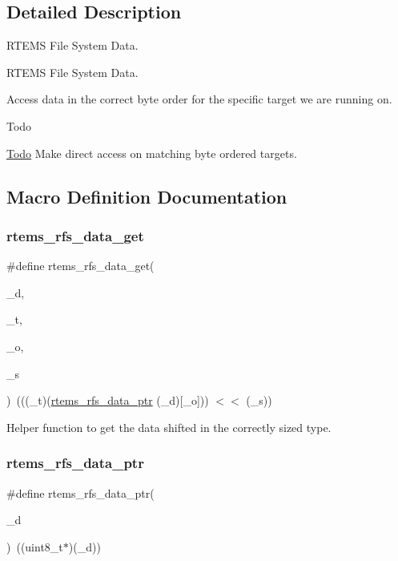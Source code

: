 \subsection{Detailed Description}
R\+T\+E\+MS File System Data. 

R\+T\+E\+MS File System Data.

Access data in the correct byte order for the specific target we are running on.

\begin{DoxyRefDesc}{Todo}
\item[\mbox{\hyperlink{todo__todo000002}{Todo}}]Make direct access on matching byte ordered targets. \end{DoxyRefDesc}


\subsection{Macro Definition Documentation}
\mbox{\label{rtems-rfs-data_8h_a0640dfd9b9ad52e3f44e7c7d387f5f4e}} 
\subsubsection{\texorpdfstring{rtems\_rfs\_data\_get}{rtems\_rfs\_data\_get}}
{\footnotesize\ttfamily \#define rtems\+\_\+rfs\+\_\+data\+\_\+get(\begin{DoxyParamCaption}\item[{}]{\+\_\+d,  }\item[{}]{\+\_\+t,  }\item[{}]{\+\_\+o,  }\item[{}]{\+\_\+s }\end{DoxyParamCaption})~(((\+\_\+t)(\mbox{\hyperlink{rtems-rfs-data_8h_a5fbf9f5b7233acca6b58f1208cd16aff}{rtems\+\_\+rfs\+\_\+data\+\_\+ptr}} (\+\_\+d)\mbox{[}\+\_\+o\mbox{]})) $<$$<$ (\+\_\+s))}

Helper function to get the data shifted in the correctly sized type. \mbox{\label{rtems-rfs-data_8h_a5fbf9f5b7233acca6b58f1208cd16aff}} 
\subsubsection{\texorpdfstring{rtems\_rfs\_data\_ptr}{rtems\_rfs\_data\_ptr}}
{\footnotesize\ttfamily \#define rtems\+\_\+rfs\+\_\+data\+\_\+ptr(\begin{DoxyParamCaption}\item[{}]{\+\_\+d }\end{DoxyParamCaption})~((uint8\+\_\+t$\ast$)(\+\_\+d))}

